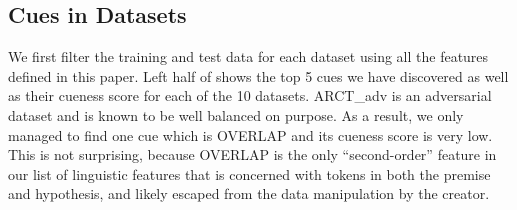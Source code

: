 \subsection{Cues in Datasets}

We first filter the training and test data for each dataset using all the features
defined in this paper. Left half of  shows the top 5 cues we have discovered
as well as their cueness score for each of the 10 datasets. ARCT\_adv is an adversarial dataset
and is known to be well balanced on purpose. As a result, we only managed to find one cue
which is OVERLAP and its cueness score is very low. This is not surprising, because
OVERLAP is the only ``second-order'' feature in our list of linguistic features that
is concerned with tokens in both the premise and hypothesis, and likely escaped from
the data manipulation by the creator. 

